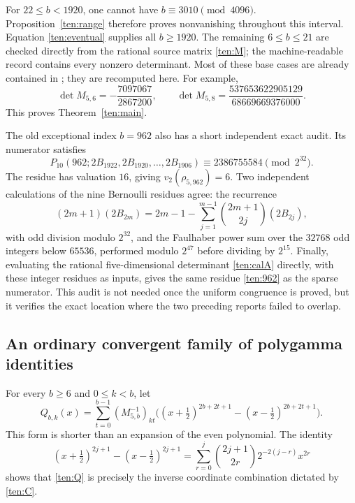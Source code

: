 For $22\le b<1920$, one cannot have $b\equiv3010\pmod{4096}$.
Proposition~\ref{ten:range} therefore proves nonvanishing throughout
this interval.  Equation \eqref{ten:eventual} supplies all
$b\ge1920$.  The remaining $6\le b\le21$ are checked directly
from the rational source matrix \eqref{ten:M}; the machine-readable
record contains every nonzero determinant.  Most of these base cases
are already contained in \cite{AlternatingIncoming}; they are recomputed here.
For example,
\[
 \det M_{5,6}=-\frac{7097067}{2867200},\qquad
 \det M_{5,8}=\frac{537653622905129}{68669669376000}.
\]
This proves Theorem~\ref{ten:main}.

The old exceptional index $b=962$ also has a short independent exact
audit.  Its numerator satisfies
\begin{equation}\label{ten:962}
 P_{10}(962;2B_{1922},2B_{1920},\ldots,2B_{1906})
       \equiv2386755584\pmod{2^{32}}.
\end{equation}
The residue has valuation $16$, giving $v_2(\rho_{5,962})=6$.
Two independent calculations of the nine Bernoulli residues agree:
the recurrence
\[
 (2m+1)(2B_{2m})=2m-1-
        \sum_{j=1}^{m-1}\binom{2m+1}{2j}(2B_{2j}),
\]
with odd division modulo $2^{32}$, and the Faulhaber power sum over
the $32768$ odd integers below $65536$, performed modulo $2^{47}$
before dividing by $2^{15}$.  Finally, evaluating the rational
five-dimensional determinant \eqref{ten:calA} directly, with
these integer residues as inputs, gives the same residue
\eqref{ten:962} as the sparse numerator.  This audit is not needed
once the uniform congruence is proved, but it verifies the exact
location where the two preceding reports failed to overlap.

\subsection{An ordinary convergent family of polygamma identities}

For every $b\ge6$ and $0\le k<b$, let
\begin{equation}\label{ten:Q}
 Q_{b,k}(x)=\sum_{t=0}^{b-1}(M_{5,b}^{-1})_{kt}
       \bigl((x+\tfrac12)^{2b+2t+1}
                    -(x-\tfrac12)^{2b+2t+1}\bigr).
\end{equation}
This form is shorter than an expansion of the even polynomial.
The identity
\[
 (x+\tfrac12)^{2j+1}-(x-\tfrac12)^{2j+1}
 =\sum_{r=0}^{j}\binom{2j+1}{2r}2^{-2(j-r)}x^{2r}
\]
shows that \eqref{ten:Q} is precisely the inverse coordinate
combination dictated by \eqref{ten:C}.

